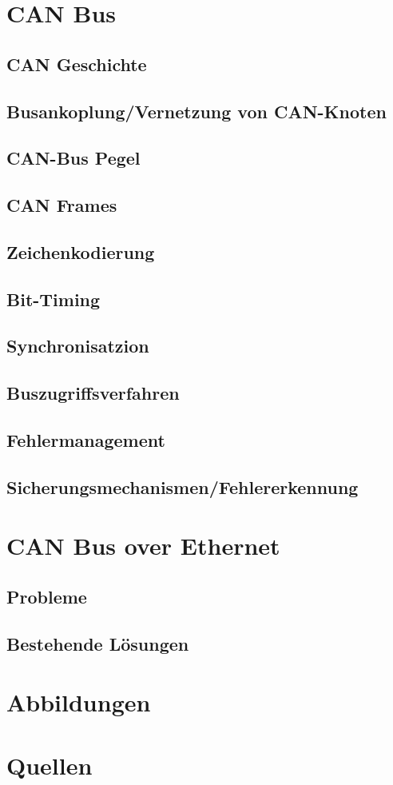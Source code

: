 \section{CAN Bus}

	\subsection{CAN Geschichte}
	
	\subsection{Busankoplung/Vernetzung von CAN-Knoten}
	
	\subsection{CAN-Bus Pegel}
	
	\subsection{CAN Frames}
	
	\subsection{Zeichenkodierung}
	
	\subsection{Bit-Timing}
	
	\subsection{Synchronisatzion}
	
	\subsection{Buszugriffsverfahren}
	
	\subsection{Fehlermanagement}
	
	\subsection{Sicherungsmechanismen/Fehlererkennung}

\section{CAN Bus over Ethernet}
	
	\subsection{Probleme}
	
	\subsection{Bestehende Lösungen}

\section{Abbildungen}

\section{Quellen}